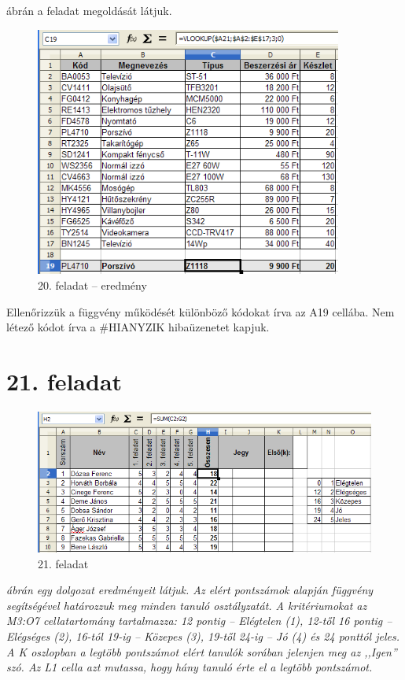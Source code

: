  ábrán a feladat megoldását látjuk.

\begin{figure}[!h]
\begin{center}
\includegraphics[width=10.104cm]{oocalcv1-img96.png}
\caption{20. feladat -- eredmény}\label{20-feladatEredmény}
\end{center}
\end{figure}

Ellenőrizzük a függvény működését
különböző kódokat írva az A19 cellába. Nem létező
kódot írva a \#HIANYZIK hibaüzenetet kapjuk.


\section{21. feladat}

\begin{figure}[!h]
\begin{center}
\includegraphics[width=13.999cm]{oocalcv1-img97.png}
\caption{21. feladat}\label{21-feladat}
\end{center}
\end{figure}

{\itshape
{} ábrán egy dolgozat eredményeit látjuk. Az elért
pontszámok alapján függvény segítségével határozzuk meg
minden tanuló osztályzatát. A kritériumokat az M3:O7
cellatartomány tartalmazza: 12 pontig -- Elégtelen (1), 12-től
16 pontig -- Elégséges (2), 16-tól 19-ig -- Közepes (3),
 19-től 24-ig -- Jó (4) és 24 ponttól jeles. A K oszlopban a
legtöbb pontszámot elért tanulók sorában jelenjen meg az
,,Igen'' szó. Az L1 cella azt mutassa,
hogy hány tanuló érte el a legtöbb pontszámot.}

